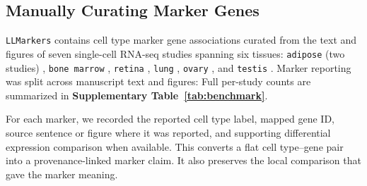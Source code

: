 \documentclass[10pt,twocolumn]{article}
\theoremstyle{plain}
\theoremstyle{definition}
\theoremstyle{remark}
\begin{document}
\subsection*{Manually Curating Marker Genes}
\texttt{LLMarkers} contains cell type marker gene associations curated from the text and figures of seven single-cell RNA-seq studies spanning six tissues: \texttt{adipose} (two studies) \citep{Emont2022,Hildreth2021}, \texttt{bone marrow} \citep{Zhong2020bone}, \texttt{retina} \citep{Gautam2021}, \texttt{lung} \citep{Adams2020}, \texttt{ovary} \citep{Wagner2020}, and \texttt{testis} \citep{Shamis2020}.  Marker reporting was split across manuscript text and figures:  Full per-study counts are summarized in \textbf{Supplementary Table~\ref{tab:benchmark}}.

For each marker, we recorded the reported cell type label, mapped gene ID, source sentence or figure where it was reported, and supporting differential expression comparison when available. This converts a flat cell type--gene pair into a provenance-linked marker claim. It also preserves the local comparison that gave the marker meaning.
\end{document}
